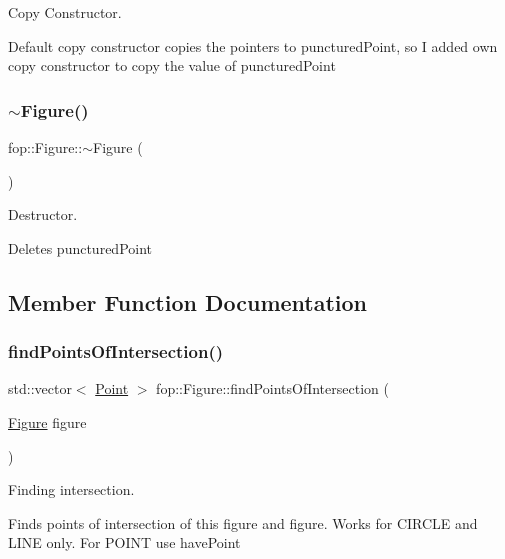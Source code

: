 Copy Constructor. 

Default copy constructor copies the pointers to \textquotesingle{}punctured\+Point\textquotesingle{}, so I added own copy constructor to copy the value of \textquotesingle{}punctured\+Point\textquotesingle{} \mbox{\label{classfop_1_1_figure_ac17b0b902f9d4963f1b98b52e03e7953}} 
\subsubsection{\texorpdfstring{$\sim$\+Figure()}{~Figure()}}
{\footnotesize\ttfamily fop\+::\+Figure\+::$\sim$\+Figure (\begin{DoxyParamCaption}{ }\end{DoxyParamCaption})}



Destructor. 

Deletes \textquotesingle{}punctured\+Point\textquotesingle{} 

\subsection{Member Function Documentation}
\mbox{\label{classfop_1_1_figure_a65bb58cd0c1cd84f8e8134d3118e760a}} 
\subsubsection{\texorpdfstring{find\+Points\+Of\+Intersection()}{findPointsOfIntersection()}}
{\footnotesize\ttfamily std\+::vector$<$ \mbox{\hyperlink{structtdp_1_1_point}{Point}} $>$ fop\+::\+Figure\+::find\+Points\+Of\+Intersection (\begin{DoxyParamCaption}\item[{\mbox{\hyperlink{classfop_1_1_figure}{Figure}}}]{figure }\end{DoxyParamCaption})}



Finding intersection. 

Finds points of intersection of \textquotesingle{}this\textquotesingle{} figure and \textquotesingle{}figure\textquotesingle{}. Works for C\+I\+R\+C\+LE and L\+I\+NE only. For P\+O\+I\+NT use \textquotesingle{}have\+Point\textquotesingle{}

